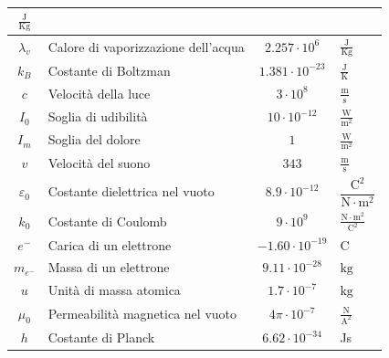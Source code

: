 \documentclass[8pt, a4paper, twocolumn, twoside,usenames]{extarticle}
\begin{document}
\begin{center}
\begin{xtabular}{c M{1.8cm} c M{1.5cm}}
    $\frac{\text{J}}{\text{Kg}}$\\\midrule
    \label{tab:cva} 
    $\lambda_v$ & Calore di vaporizzazione dell'acqua & $2.257\cdot10^6$ &
    $\frac{\text{J}}{\text{Kg}}$\\\midrule
    \label{tab:kB} 
    $k_B$ & Costante di Boltzman & $1.381\cdot10^{-23}$ & 
    $\frac{\text{J}}{\text{K}}$\\ \midrule
    \label{tab:c} 
    $c$ & Velocità della luce & $3\cdot10^8$ & $\frac{\text{m}}{\text{s}}$\\\midrule
    \label{tab:I0} 
    $I_0$ & Soglia di udibilità & $10\cdot10^{-12}$ & 
    $\frac{\text{W}}{\text{m}^2}$\\ \midrule
    \label{tab:Im} 
    $I_m$ & Soglia del dolore & $1$ & $\frac{\text{W}}{\text{m}^2}$\\ \midrule
    \label{tab:vs} 
    $v$ & Velocità del suono & $343$ & $\frac{\text{m}}{\text{s}}$\\ \midrule
    \label{tab:e0} 
    $\varepsilon_0$& Costante dielettrica nel vuoto&$8.9\cdot10^{-12}$&
    $\dfrac{\text{C}^2}{\text{N}\cdot\text{m}^2}$\\ \midrule
    \label{tab:k0}
    $k_0$ & Costante di Coulomb & $9\cdot10^9$ & 
    $\frac{\text{N}\cdot\text{m}^2}{\text{C}^2}$\\ \midrule
    \label{tab:e-} 
    $e^{-}$ & Carica di un elettrone & $-1.60\cdot10^{-19}$ & $\text{C}$\\ \midrule
    \label{tab:me-} 
    $m_{e^{-}}$ & Massa di un elettrone & $9.11\cdot10^{-28}$ & $\text{kg}$\\\midrule
    \label{tab:u} 
    $u$ & Unità di massa atomica & $1.7\cdot10^{-7}$ & $\text{kg}$\\\midrule
    \label{tab:mu0} 
    $\mu_0$ & Permeabilità magnetica nel vuoto & $4\pi\cdot10^{-7}$ & 
    $\frac{\text{N}}{\text{A}^2}$\\\midrule
    \label{tab:h}
    $h$ & Costante di Planck & $6.62\cdot10^{-34}$ & Js\\
    \midrule
  \end{xtabular}
\end{center}

\newpage
\end{document}
